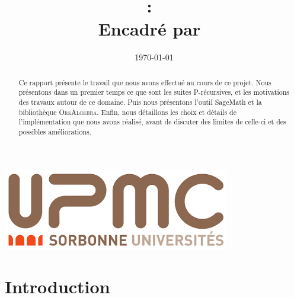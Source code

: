 \documentclass[12pt]{article}
\title{
\vspace{1in}
\textmd{\textbf{\hmwkClass:\ \hmwkTitle}}\\
\vspace{0.1in}\large{Encadré par\ \hmwkClassInstructor}
}
\author{\textbf{\hmwkAuthorName}}
\date{\today}
\begin{document}
\maketitle
\begin{abstract}
    Ce rapport présente le travail que nous avons effectué au cours de ce projet.
    Nous présentons dans un premier temps ce que sont les suites P-récursives, et les
    motivations des travaux autour de ce domaine.
    Puis nous présentons l'outil SageMath et la bibliothèque \textsc{OreAlgebra}.
    Enfin, nous détaillons les choix et détails de l'implémentation que nous avons réalisé,
    avant de discuter des limites de celle-ci et des possibles améliorations.
\end{abstract}
\vspace{1in}
\begin{center}
    \includegraphics[scale=0.7]{figures/upmc}
\end{center}


\setcounter{tocdepth}{2}

\newpage
\tableofcontents
\newpage

\section{Introduction}
\end{document}
